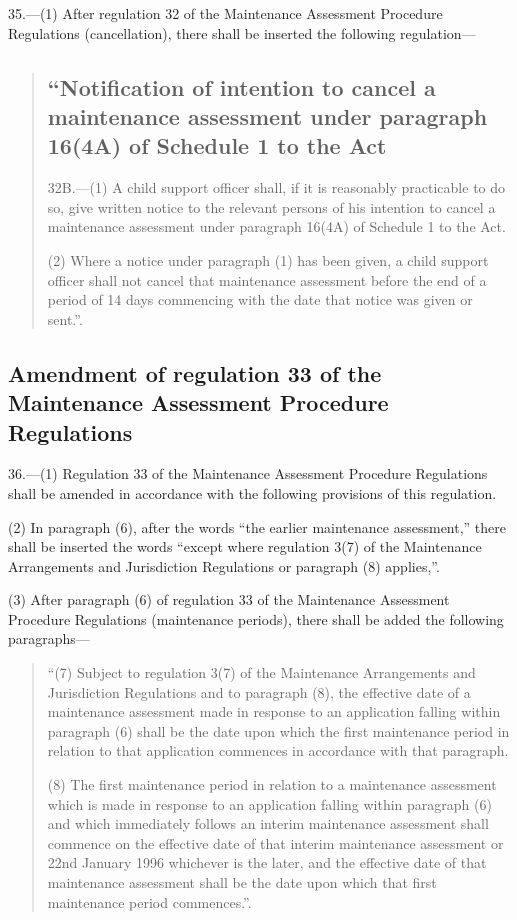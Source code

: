 \documentclass[12pt,a4paper]{article}
\begin{document}
35.—(1) After regulation 32 of the Maintenance Assessment Procedure Regulations (cancellation), there shall be inserted the following regulation—
\begin{quotation}
\subsection*{“Notification of intention to cancel a maintenance assessment under paragraph 16(4A) of Schedule 1 to the Act}

32B.—(1) A child support officer shall, if it is reasonably practicable to do so, give written notice to the relevant persons of his intention to cancel a maintenance assessment under paragraph 16(4A) of Schedule 1 to the Act.

(2) Where a notice under paragraph (1) has been given, a child support officer shall not cancel that maintenance assessment before the end of a period of 14 days commencing with the date that notice was given or sent.”.
\end{quotation}

\subsection[36. Amendment of regulation 33 of the Maintenance Assessment Procedure Regulations]{Amendment of regulation 33 of the Maintenance Assessment Procedure Regulations}

36.—(1) Regulation 33 of the Maintenance Assessment Procedure Regulations shall be amended in accordance with the following provisions of this regulation.

(2) In paragraph (6), after the words “the earlier maintenance assessment,” there shall be inserted the words “except where regulation 3(7) of the Maintenance Arrangements and Jurisdiction Regulations or paragraph (8) applies,”.

(3) After paragraph (6) of regulation 33 of the Maintenance Assessment Procedure Regulations (maintenance periods), there shall be added the following paragraphs—
\begin{quotation}
“(7) Subject to regulation 3(7) of the Maintenance Arrangements and Jurisdiction Regulations and to paragraph (8), the effective date of a maintenance assessment made in response to an application falling within paragraph (6) shall be the date upon which the first maintenance period in relation to that application commences in accordance with that paragraph.

(8) The first maintenance period in relation to a maintenance assessment which is made in response to an application falling within paragraph (6) and which immediately follows an interim maintenance assessment shall commence on the effective date of that interim maintenance assessment or 22nd January 1996 whichever is the later, and the effective date of that maintenance assessment shall be the date upon which that first maintenance period commences.”.
\end{quotation}
\end{document}
